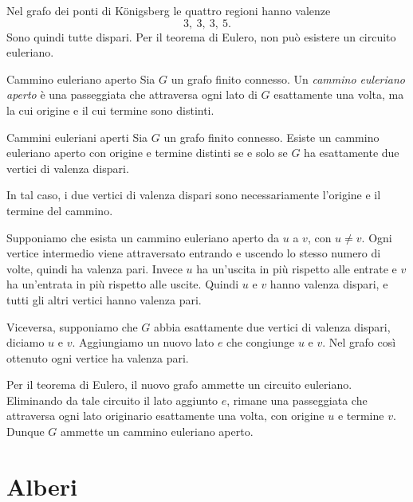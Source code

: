 \documentclass[a4paper]{article}
\begin{document}
\begin{snippetproof}{}
    Nel grafo dei ponti di Königsberg le quattro regioni hanno valenze
    \[
        3,\ 3,\ 3,\ 5.
    \]
    Sono quindi tutte dispari. Per il teorema di Eulero, non può esistere un circuito euleriano.
\end{snippetproof}

\begin{snippetdefinition}{Cammino euleriano aperto}
    Sia \(G\) un grafo finito connesso. Un \emph{cammino euleriano aperto} è una passeggiata che attraversa ogni lato di \(G\) esattamente una volta, ma la cui origine e il cui termine sono distinti.
\end{snippetdefinition}

\begin{snippettheorem}{Cammini euleriani aperti}
    Sia \(G\) un grafo finito connesso. Esiste un cammino euleriano aperto con origine e termine distinti se e solo se \(G\) ha esattamente due vertici di valenza dispari.

    In tal caso, i due vertici di valenza dispari sono necessariamente l'origine e il termine del cammino.
\end{snippettheorem}

\begin{snippetproof}{}
    Supponiamo che esista un cammino euleriano aperto da \(u\) a \(v\), con \(u\neq v\). Ogni vertice intermedio viene attraversato entrando e uscendo lo stesso numero di volte, quindi ha valenza pari. Invece \(u\) ha un'uscita in più rispetto alle entrate e \(v\) ha un'entrata in più rispetto alle uscite. Quindi \(u\) e \(v\) hanno valenza dispari, e tutti gli altri vertici hanno valenza pari.

    Viceversa, supponiamo che \(G\) abbia esattamente due vertici di valenza dispari, diciamo \(u\) e \(v\). Aggiungiamo un nuovo lato \(e\) che congiunge \(u\) e \(v\). Nel grafo così ottenuto ogni vertice ha valenza pari.

    Per il teorema di Eulero, il nuovo grafo ammette un circuito euleriano. Eliminando da tale circuito il lato aggiunto \(e\), rimane una passeggiata che attraversa ogni lato originario esattamente una volta, con origine \(u\) e termine \(v\). Dunque \(G\) ammette un cammino euleriano aperto.
\end{snippetproof}

\section{Alberi}
\end{document}
